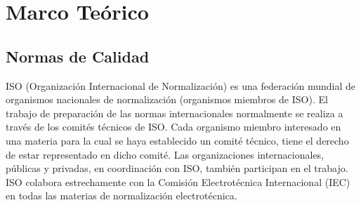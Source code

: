 \thispagestyle{plain}

\chapter{Marco Teórico}
	\section{Normas de Calidad}
		ISO (Organización Internacional de Normalización) es una federación mundial de organismos
		nacionales de normalización (organismos miembros de ISO). El trabajo de preparación de las normas
		internacionales normalmente se realiza a través de los comités técnicos de ISO. Cada organismo
		miembro interesado en una materia para la cual se haya establecido un comité técnico, tiene el derecho
		de estar representado en dicho comité. Las organizaciones internacionales, públicas y privadas, en
		coordinación con ISO, también participan en el trabajo. ISO colabora estrechamente con la Comisión
		Electrotécnica Internacional (IEC) en todas las materias de normalización electrotécnica.
		
		
		
		
		
		
		
					

				
				

			
			
				
				